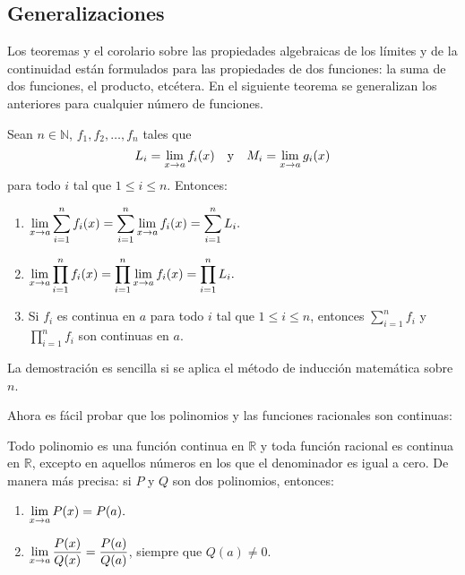 \subsection{Generalizaciones}
Los teoremas y el corolario sobre las propiedades algebraicas de los límites y de la continuidad
están formulados para las propiedades de dos funciones: la suma de dos funciones, el producto,
etcétera. En el siguiente teorema se generalizan los anteriores para cualquier número de funciones.

\begin{corocal}\label{teol:AlgebraGeneralizada}%
Sean $n\in\mathbb{N}$, $f_1, f_2, \ldots, f_n$ tales que
\[
L_i = \limjc{f_i(x)}{x}{a} \yjc M_i = \limjc{g_i(x)}{x}{a}
\]
para todo $i$ tal que $1\leq i \leq n$. Entonces:
\begin{enumerate}
\item \label{teol:SumaGeneralizada} $\displaystyle{\limjc{\sum_{i=1}^nf_i(x)}{x}{a} =
    \sum_{i=1}^n \limjc{f_i(x)}{x}{a} = \sum_{i=1}^n L_i}.$
\item \label{teol:ProductoGeneralizado} $\displaystyle{\limjc{\prod_{i=1}^nf_i(x)}{x}{a} =
    \prod_{i=1}^n \limjc{f_i(x)}{x}{a} = \prod_{i=1}^n L_i}.$
\item Si $f_i$ es continua en $a$ para todo $i$ tal que $1\leq i \leq n$, entonces
    $\sum_{i=1}^nf_i$ y $\prod_{i=1}^nf_i$ son continuas en $a$.
\end{enumerate}
\end{corocal}

La demostración es sencilla si se aplica el método de inducción matemática sobre $n$.

Ahora es fácil probar que los polinomios y las funciones racionales son continuas:

\begin{teocal}\label{teol:PolinRacionContinuas}%
Todo polinomio es una función continua en $\mathbb{R}$ y toda función racional es continua en
$\mathbb{R}$, excepto en aquellos números en los que el denominador es igual a cero. De manera más
precisa: si $P$ y $Q$ son dos polinomios, entonces:
\begin{enumerate}
\item \label{teol:PolinContinua} $\displaystyle{\limjc{P(x)}{x}{a} = P(a).}$
\item \label{teol:RacionContinua} $\displaystyle{\limjc{\frac{P(x)}{Q(x)}}{x}{a} =
    \frac{P(a)}{Q(a)}}$, siempre que $Q(a) \neq 0$.
\end{enumerate}
\end{teocal}

